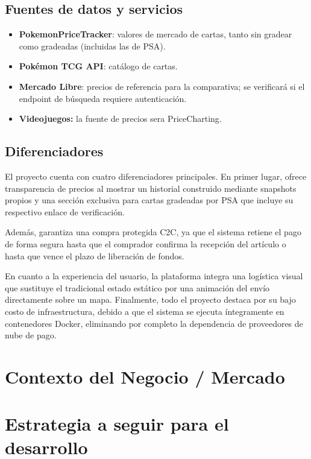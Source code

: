 \documentclass[letterpaper,11pt]{article}
\begin{document}
\subsection{Fuentes de datos y servicios}
\begin{itemize}
    \item \textbf{PokemonPriceTracker}: valores de mercado de cartas, tanto sin gradear como gradeadas (incluidas las de PSA).
    \item \textbf{Pokémon TCG API}: catálogo de cartas.
    \item \textbf{Mercado Libre}: precios de referencia para la comparativa; se verificará si el endpoint de búsqueda requiere autenticación.
    \item \textbf{Videojuegos:} la fuente de precios sera PriceCharting. 
\end{itemize}

\subsection{Diferenciadores}
El proyecto cuenta con cuatro diferenciadores principales. En primer lugar, ofrece transparencia de precios al mostrar un historial construido mediante snapshots propios y una sección exclusiva para cartas gradeadas por PSA que incluye su respectivo enlace de verificación.

Además, garantiza una compra protegida C2C, ya que el sistema retiene el pago de forma segura hasta que el comprador confirma la recepción del artículo o hasta que vence el plazo de liberación de fondos.

En cuanto a la experiencia del usuario, la plataforma integra una logística visual que sustituye el tradicional estado estático por una animación del envío directamente sobre un mapa. Finalmente, todo el proyecto destaca por su bajo costo de infraestructura, debido a que el sistema se ejecuta íntegramente en contenedores Docker, eliminando por completo la dependencia de proveedores de nube de pago.

\section{Contexto del Negocio / Mercado}



\newpage
\section{Estrategia a seguir para el desarrollo}
\end{document}
